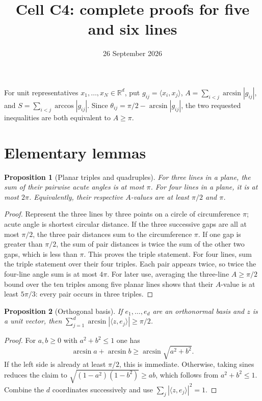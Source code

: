 \documentclass[11pt]{article}
\newtheorem{proposition}{Proposition}
\begin{document}
\title{Cell C4: complete proofs for five and six lines}
\author{}
\date{26 September 2026}
\maketitle

\noindent{}
\medskip

For unit representatives $x_1,\ldots,x_N\in\mathbb R^d$, put
$g_{ij}=\langle x_i,x_j\rangle$,
$A=\sum_{i<j}\arcsin|g_{ij}|$, and
$S=\sum_{i<j}\arccos|g_{ij}|$.  Since
$\theta_{ij}=\pi/2-\arcsin|g_{ij}|$, the two requested inequalities
are both equivalent to $A\geq\pi$.

\section*{Elementary lemmas}

\begin{proposition}[Planar triples and quadruples]
For three lines in a plane, the sum of their pairwise acute angles
is at most $\pi$.  For four lines in a plane, it is at most $2\pi$.
Equivalently, their respective $A$-values are at least $\pi/2$
and $\pi$.
\end{proposition}
\begin{proof}
Represent the three lines by three points on a circle of circumference
$\pi$; acute angle is shortest circular distance.  If the three
successive gaps are all at most $\pi/2$, the three pair distances sum
to the circumference $\pi$.  If one gap is greater than $\pi/2$,
the sum of pair distances is twice the sum of the other two gaps,
which is less than $\pi$.  This proves the triple statement.
For four lines, sum the triple statement over their four triples.
Each pair appears twice, so twice the four-line angle sum is at most
$4\pi$.
For later use, averaging the three-line $A\geq\pi/2$ bound over
the ten triples among five planar lines shows that their $A$-value
is at least $5\pi/3$: every pair occurs in three triples.
\end{proof}

\begin{proposition}[Orthogonal basis]
If $e_1,\ldots,e_d$ are an orthonormal basis and $z$ is a unit
vector, then $\sum_{j=1}^d\arcsin|\langle z,e_j\rangle|\geq\pi/2$.
\end{proposition}
\begin{proof}
For $a,b\geq0$ with $a^2+b^2\leq1$ one has
\[
 \arcsin a+\arcsin b\geq\arcsin\sqrt{a^2+b^2}.
\]
If the left side is already at least $\pi/2$, this is immediate.
Otherwise, taking sines reduces the claim to
$\sqrt{(1-a^2)(1-b^2)}\geq ab$, which follows from
$a^2+b^2\leq1$.  Combine the $d$ coordinates successively and use
$\sum_j|\langle z,e_j\rangle|^2=1$.
\end{proof}
\end{document}
